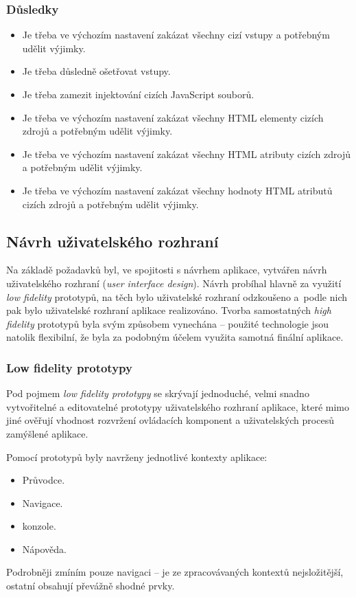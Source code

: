\subsubsection{Důsledky}
\begin{itemize}
 \item Je třeba ve výchozím nastavení zakázat všechny cizí vstupy a potřebným udělit výjimky.
 \item Je třeba důsledně ošetřovat vstupy.
 \item Je třeba zamezit injektování cizích JavaScript souborů.
 \item Je třeba ve výchozím nastavení zakázat všechny HTML elementy cizích zdrojů a potřebným udělit výjimky.
 \item Je třeba ve výchozím nastavení zakázat všechny HTML atributy cizích zdrojů a potřebným udělit výjimky.
 \item Je třeba ve výchozím nastavení zakázat všechny hodnoty HTML atributů cizích zdrojů a potřebným udělit výjimky.
\end{itemize}


\subsection{Návrh uživatelského rozhraní}
Na základě požadavků byl, ve spojitosti s návrhem aplikace, vytvářen návrh uživatelského rozhraní (\textit{user interface design}). Návrh probíhal hlavně za využití \textit{low fidelity} prototypů, na těch bylo uživatelské rozhraní odzkoušeno a~podle nich pak bylo uživatelské rozhraní aplikace realizováno. Tvorba samostatných \textit{high fidelity} prototypů byla svým způsobem vynechána -- použité technologie jsou natolik flexibilní, že byla za podobným účelem využita samotná finální aplikace.

\subsubsection{Low fidelity prototypy}
Pod pojmem \textit{low fidelity prototypy} se skrývají jednoduché, velmi snadno vytvořitelné a editovatelné prototypy uživatelského rozhraní aplikace, které mimo jiné ověřují vhodnost rozvržení ovládacích komponent a uživatelských procesů zamýšlené aplikace.

Pomocí prototypů byly navrženy jednotlivé kontexty aplikace:
\begin{itemize}
 \item Průvodce.
 \item Navigace.
 \item {} konzole.
 \item Nápověda.
\end{itemize}
Podrobněji zmíním pouze navigaci -- je ze zpracovávaných kontextů nejsložitější, ostatní obsahují převážně shodné prvky.

